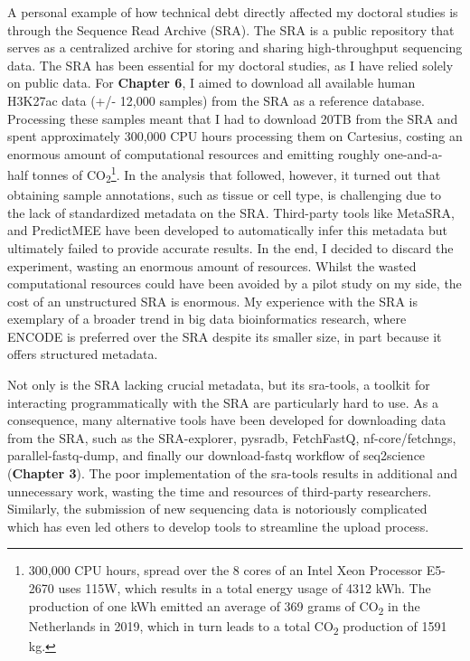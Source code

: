 A personal example of how technical debt directly affected my doctoral studies is through the Sequence Read Archive (SRA). The SRA is a public repository that serves as a centralized archive for storing and sharing high-throughput sequencing data. The SRA has been essential for my doctoral studies, as I have relied solely on public data. For \textbf{Chapter 6}, I aimed to download all available human H3K27ac data (+/- 12,000 samples) from the SRA as a reference database. Processing these samples meant that I had to download 20TB from the SRA and spent approximately 300,000 CPU hours processing them on Cartesius, costing an enormous amount of computational resources and emitting roughly one-and-a-half tonnes of CO\textsubscript{2}\footnote[2]{300,000 CPU hours, spread over the 8 cores of an Intel Xeon Processor E5-2670 uses 115W\cite{intelIntelXeon}, which results in a total energy usage of 4312 kWh. The production of one kWh emitted an average of 369 grams of CO\textsubscript{2} in the Netherlands in 2019\cite{CO2}, which in turn leads to a total CO\textsubscript{2} production of 1591 kg.}. In the analysis that followed, however, it turned out that obtaining sample annotations, such as tissue or cell type, is challenging due to the lack of standardized metadata on the SRA. Third-party tools like MetaSRA\cite{Bernstein2017}, and PredictMEE\cite{Klie2021} have been developed to automatically infer this metadata but ultimately failed to provide accurate results. In the end, I decided to discard the experiment, wasting an enormous amount of resources. Whilst the wasted computational resources could have been avoided by a pilot study on my side, the cost of an unstructured SRA is enormous. My experience with the SRA is exemplary of a broader trend in big data bioinformatics research, where ENCODE is preferred over the SRA despite its smaller size, in part because it offers structured metadata.

Not only is the SRA lacking crucial metadata, but its sra-tools, a toolkit for interacting programmatically with the SRA are particularly hard to use. As a consequence, many alternative tools have been developed for downloading data from the SRA, such as the SRA-explorer\cite{sraexplorer}, pysradb\cite{pysradb}, FetchFastQ\cite{galvez2022metadata}, nf-core/fetchngs\cite{fetchngs}, parallel-fastq-dump\cite{parallelfastq}, and finally our download-fastq workflow of seq2science\cite{seq2science} (\textbf{Chapter 3}). The poor implementation of the sra-tools results in additional and unnecessary work, wasting the time and resources of third-party researchers. Similarly, the submission of new sequencing data is notoriously complicated which has even led others to develop tools to streamline the upload process\cite{Quiones2020}. 

